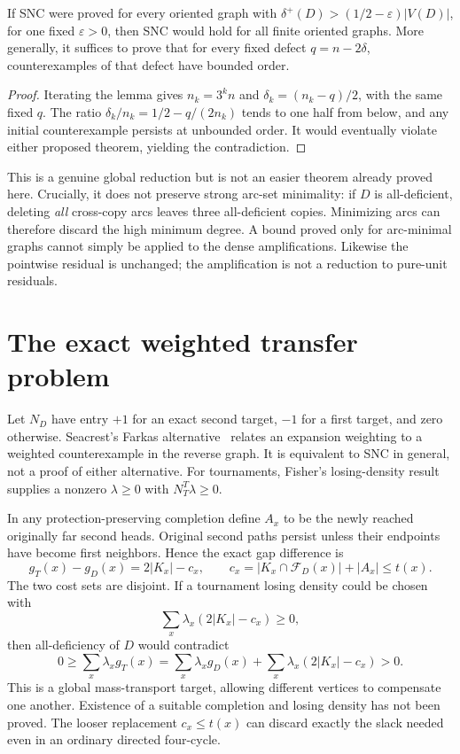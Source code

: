 \begin{corollary}
\label{cor:global-dense-target}
If SNC were proved for every oriented graph with
$\delta^+(D)>(1/2-\varepsilon)|V(D)|$, for one fixed $\varepsilon>0$,
then SNC would hold for all finite oriented graphs.
More generally, it suffices to prove that for every fixed defect
$q=n-2\delta$, counterexamples of that defect have bounded order.
\end{corollary}
\begin{proof}
Iterating the lemma gives $n_k=3^kn$ and
$\delta_k=(n_k-q)/2$, with the same fixed $q$.
The ratio $\delta_k/n_k=1/2-q/(2n_k)$ tends to one half from below,
and any initial counterexample persists at unbounded order. It would
eventually violate either proposed theorem, yielding the contradiction.
\end{proof}

This is a genuine global reduction but is not an easier theorem already
proved here. Crucially, it does not preserve strong arc-set minimality:
if $D$ is all-deficient, deleting \emph{all} cross-copy arcs leaves three
all-deficient copies. Minimizing arcs can therefore discard the high
minimum degree. A bound proved only for arc-minimal graphs cannot simply
be applied to the dense amplifications. Likewise the pointwise residual
is unchanged; the amplification is not a reduction to pure-unit residuals.

\section{The exact weighted transfer problem}
\label{sec:global-weighted-transfer}

Let $N_D$ have entry $+1$ for an exact second target, $-1$ for a first
target, and zero otherwise. Seacrest's Farkas alternative~\cite{Seacrest2015} relates an
expansion weighting to a weighted counterexample in the reverse graph.
It is equivalent to SNC in general, not a proof of either alternative.
For tournaments, Fisher's losing-density result supplies a nonzero
$\lambda\ge0$ with $N_T^T\lambda\ge0$.

In any protection-preserving completion define $A_x$ to be the newly
reached originally far second heads. Original second paths persist
unless their endpoints have become first neighbors. Hence the exact
gap difference is
\[
 g_T(x)-g_D(x)=2|K_x|-c_x,
 \qquad c_x=|K_x\cap\mathcal F_D(x)|+|A_x|\le t(x).
\]
The two cost sets are disjoint. If a tournament losing density could be
chosen with
\[
 \sum_x\lambda_x(2|K_x|-c_x)\ge0,
\]
then all-deficiency of $D$ would contradict
\[
 0\ge\sum_x\lambda_x g_T(x)
   =\sum_x\lambda_x g_D(x)+
      \sum_x\lambda_x(2|K_x|-c_x)>0.
\]
This is a global mass-transport target, allowing different vertices to
compensate one another. Existence of a suitable completion and losing
density has not been proved. The looser replacement $c_x\le t(x)$ can
discard exactly the slack needed even in an ordinary directed four-cycle.

